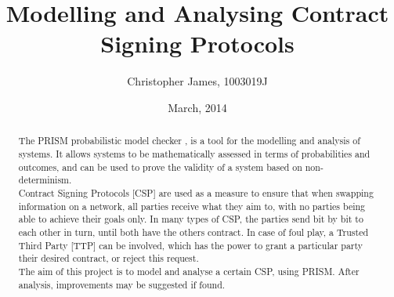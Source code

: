 \documentclass{l4proj}
\begin{document}



\title{Modelling and Analysing Contract Signing Protocols}
\author{Christopher James, 1003019J}
\date{March, 2014}
\maketitle

\begin{abstract}
The PRISM probabilistic model checker \cite{Pri}, is a tool for the modelling and analysis of systems. It allows systems to be mathematically assessed in terms of probabilities and outcomes, and can be used to prove the validity of a system based on non-determinism. \\
Contract Signing Protocols [CSP] are used as a measure to ensure that when swapping information on a network, all parties receive what they aim to, with no parties being able to achieve their goals only. In many types of CSP, the parties send bit by bit to each other in turn, until both have the others contract. In case of foul play, a Trusted Third Party [TTP] can be involved, which has the power to grant a particular party their desired contract, or reject this request. \\
The aim of this project is to model and analyse a certain CSP, using PRISM. After analysis, improvements may be suggested if found.
\end{abstract}

\educationalconsent
%
%
\tableofcontents
\end{document}
